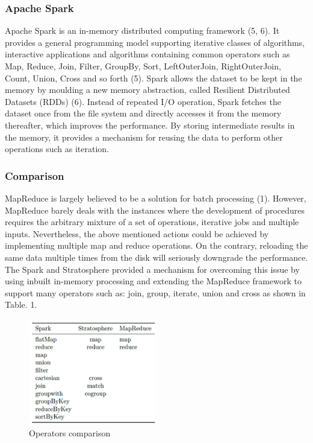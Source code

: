 \subsubsection{Apache Spark} \label{subsubsec-lr-batchlayer-spark}
Apache Spark is an in-memory distributed computing framework (5, 6). It provides a general programming model supporting iterative classes of algorithms, interactive applications and algorithms containing common operators such as Map, Reduce, Join, Filter, GroupBy, Sort, LeftOuterJoin, RightOuterJoin, Count, Union, Cross and so forth (5). Spark allows the dataset to be kept in the memory by moulding a new memory abstraction, called Resilient Distributed Datasets (RDDs) (6). Instead of repeated I/O operation, Spark fetches the dataset once from the file system and directly accesses it from the memory thereafter, which improves the performance. By storing intermediate results in the memory, it provides a mechanism for reusing the data to perform other operations such as iteration. 

\subsubsection{Comparison} \label{subsubsec-lr-batchlayer-comparison}
MapReduce is largely believed to be a solution for batch processing (1). However, MapReduce barely deals with the instances where the development of procedures requires the arbitrary mixture of a set of operations, iterative jobs and multiple inputs. Nevertheless, the above mentioned actions could be achieved by implementing multiple map and reduce operations. On the contrary, reloading the same data multiple times from the disk will seriously downgrade the performance. The Spark and Stratosphere provided a mechanism for overcoming this issue by using inbuilt in-memory processing and extending the MapReduce framework to support many operators such as: join, group, iterate, union and cross as shown in Table. 1.

\begin{figure}[H]
\centering
\includegraphics[width=0.5\textwidth]{Figures/batch_comparison.png}
\caption{Operators comparison}\label{fig-batch-comparison}
\end{figure}


